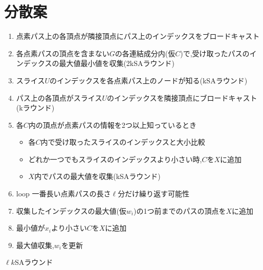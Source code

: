 \documentclass{jarticle}
\theoremstyle{definition}
\begin{document}
\newpage

\section*{分散案}
\begin{enumerate}
  \item 点素パス上の各頂点が隣接頂点にパス上のインデックスをブロードキャスト
  \item 各点素パスの頂点を含まない$G$の各連結成分内(仮$C$)で,受け取ったパスのインデックスの最大値最小値を収集(2kSAラウンド)
  \item スライス$U$のインデックスを各点素パス上のノードが知る(kSAラウンド)
  \item パス上の各頂点がスライス$U$のインデックスを隣接頂点にブロードキャスト(kラウンド)
  \item 各$C$内の頂点が点素パスの情報を2つ以上知っているとき
  \begin{itemize}
    \item 各$C$内で受け取ったスライスのインデックスと大小比較
    \item どれか一つでもスライスのインデックスより小さい時,$C$を$X$に追加
    \item $X$内でパスの最大値を収集(kSAラウンド)
  \end{itemize}
  \item loop 一番長い点素パスの長さ$\ell$分だけ繰り返す可能性
  \item 収集したインデックスの最大値(仮$w_i$)の1つ前までのパスの頂点を$X$に追加
  \item 最小値が$x_i$より小さい$C$を$X$に追加
  \item 最大値収集,$w_i$を更新
\end{enumerate}
$\ell k$SAラウンド 
\end{document}
